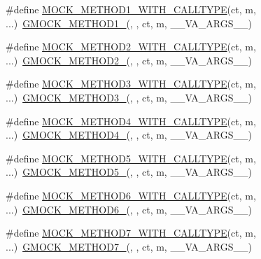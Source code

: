 \begin{DoxyCompactItemize}
\item 
\#define \hyperlink{gmock-generated-function-mockers_8h_a3ffee4ba10588254eb44e67603e9de71}{M\+O\+C\+K\+\_\+\+M\+E\+T\+H\+O\+D1\+\_\+\+W\+I\+T\+H\+\_\+\+C\+A\+L\+L\+T\+Y\+PE}(ct,  m, ...)~\hyperlink{gmock-generated-function-mockers_8h_a1bc0012d62440dda77208dabdf4925c9}{G\+M\+O\+C\+K\+\_\+\+M\+E\+T\+H\+O\+D1\+\_\+}(, , ct, m, \+\_\+\+\_\+\+V\+A\+\_\+\+A\+R\+G\+S\+\_\+\+\_\+)
\item 
\#define \hyperlink{gmock-generated-function-mockers_8h_a27fcf1de830388291c2a81b144b8f89b}{M\+O\+C\+K\+\_\+\+M\+E\+T\+H\+O\+D2\+\_\+\+W\+I\+T\+H\+\_\+\+C\+A\+L\+L\+T\+Y\+PE}(ct,  m, ...)~\hyperlink{gmock-generated-function-mockers_8h_a885295ca6bebb15efb3fc786218c5d47}{G\+M\+O\+C\+K\+\_\+\+M\+E\+T\+H\+O\+D2\+\_\+}(, , ct, m, \+\_\+\+\_\+\+V\+A\+\_\+\+A\+R\+G\+S\+\_\+\+\_\+)
\item 
\#define \hyperlink{gmock-generated-function-mockers_8h_afef2985a236f7588139c690d395758fb}{M\+O\+C\+K\+\_\+\+M\+E\+T\+H\+O\+D3\+\_\+\+W\+I\+T\+H\+\_\+\+C\+A\+L\+L\+T\+Y\+PE}(ct,  m, ...)~\hyperlink{gmock-generated-function-mockers_8h_af7c77ba511c631de02bb8c45a6ed3045}{G\+M\+O\+C\+K\+\_\+\+M\+E\+T\+H\+O\+D3\+\_\+}(, , ct, m, \+\_\+\+\_\+\+V\+A\+\_\+\+A\+R\+G\+S\+\_\+\+\_\+)
\item 
\#define \hyperlink{gmock-generated-function-mockers_8h_a333774e6dda450fc85c241bff4b9957a}{M\+O\+C\+K\+\_\+\+M\+E\+T\+H\+O\+D4\+\_\+\+W\+I\+T\+H\+\_\+\+C\+A\+L\+L\+T\+Y\+PE}(ct,  m, ...)~\hyperlink{gmock-generated-function-mockers_8h_ab6430f2cfad9de4aca5258ea559294bb}{G\+M\+O\+C\+K\+\_\+\+M\+E\+T\+H\+O\+D4\+\_\+}(, , ct, m, \+\_\+\+\_\+\+V\+A\+\_\+\+A\+R\+G\+S\+\_\+\+\_\+)
\item 
\#define \hyperlink{gmock-generated-function-mockers_8h_a195de665a5ab83cf56ac9562ccc73838}{M\+O\+C\+K\+\_\+\+M\+E\+T\+H\+O\+D5\+\_\+\+W\+I\+T\+H\+\_\+\+C\+A\+L\+L\+T\+Y\+PE}(ct,  m, ...)~\hyperlink{gmock-generated-function-mockers_8h_a9e3ecd392499ab19a4a6d3adcabf56f6}{G\+M\+O\+C\+K\+\_\+\+M\+E\+T\+H\+O\+D5\+\_\+}(, , ct, m, \+\_\+\+\_\+\+V\+A\+\_\+\+A\+R\+G\+S\+\_\+\+\_\+)
\item 
\#define \hyperlink{gmock-generated-function-mockers_8h_a1e55bb6ae5cfcb0403c867541f5f0931}{M\+O\+C\+K\+\_\+\+M\+E\+T\+H\+O\+D6\+\_\+\+W\+I\+T\+H\+\_\+\+C\+A\+L\+L\+T\+Y\+PE}(ct,  m, ...)~\hyperlink{gmock-generated-function-mockers_8h_ad0ca7f6973a076d0af4c953f8ed91842}{G\+M\+O\+C\+K\+\_\+\+M\+E\+T\+H\+O\+D6\+\_\+}(, , ct, m, \+\_\+\+\_\+\+V\+A\+\_\+\+A\+R\+G\+S\+\_\+\+\_\+)
\item 
\#define \hyperlink{gmock-generated-function-mockers_8h_a696e2f91735b99b2a37c369a74bad647}{M\+O\+C\+K\+\_\+\+M\+E\+T\+H\+O\+D7\+\_\+\+W\+I\+T\+H\+\_\+\+C\+A\+L\+L\+T\+Y\+PE}(ct,  m, ...)~\hyperlink{gmock-generated-function-mockers_8h_ab98a8399ba62b53b375c2807f4d39d2f}{G\+M\+O\+C\+K\+\_\+\+M\+E\+T\+H\+O\+D7\+\_\+}(, , ct, m, \+\_\+\+\_\+\+V\+A\+\_\+\+A\+R\+G\+S\+\_\+\+\_\+)

\end{DoxyCompactItemize}
